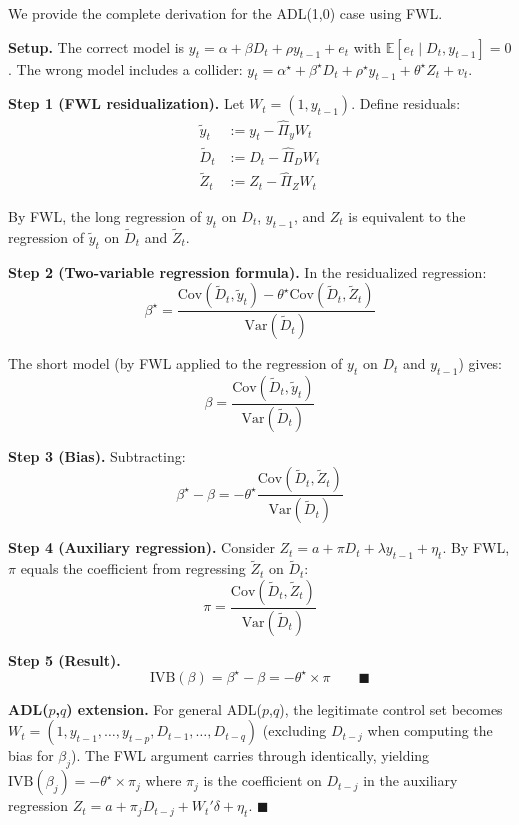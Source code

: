 \documentclass[
]{article}
\begin{document}
We provide the complete derivation for the ADL(1,0) case using FWL.

\textbf{Setup.} The correct model is
\(y_t = \alpha + \beta D_t + \rho y_{t-1} + e_t\) with
\(\mathbb{E}[e_t \mid D_t, y_{t-1}] = 0\). The wrong model includes a
collider:
\(y_t = \alpha^{\star} + \beta^{\star} D_t + \rho^{\star} y_{t-1} + \theta^{\star} Z_t + v_t\).

\textbf{Step 1 (FWL residualization).} Let \(W_t = (1, y_{t-1})\).
Define residuals: \begin{align*}
\tilde{y}_t &:= y_t - \hat{\Pi}_y W_t \\
\tilde{D}_t &:= D_t - \hat{\Pi}_D W_t \\
\tilde{Z}_t &:= Z_t - \hat{\Pi}_Z W_t
\end{align*}

By FWL, the long regression of \(y_t\) on \(D_t\), \(y_{t-1}\), and
\(Z_t\) is equivalent to the regression of \(\tilde{y}_t\) on
\(\tilde{D}_t\) and \(\tilde{Z}_t\).

\textbf{Step 2 (Two-variable regression formula).} In the residualized
regression: \[
\beta^{\star} = \frac{\text{Cov}(\tilde{D}_t, \tilde{y}_t) - \theta^{\star} \text{Cov}(\tilde{D}_t, \tilde{Z}_t)}{\text{Var}(\tilde{D}_t)}
\]

The short model (by FWL applied to the regression of \(y_t\) on \(D_t\)
and \(y_{t-1}\)) gives: \[
\beta = \frac{\text{Cov}(\tilde{D}_t, \tilde{y}_t)}{\text{Var}(\tilde{D}_t)}
\]

\textbf{Step 3 (Bias).} Subtracting: \[
\beta^{\star} - \beta = -\theta^{\star} \frac{\text{Cov}(\tilde{D}_t, \tilde{Z}_t)}{\text{Var}(\tilde{D}_t)}
\]

\textbf{Step 4 (Auxiliary regression).} Consider
\(Z_t = a + \pi D_t + \lambda y_{t-1} + \eta_t\). By FWL, \(\pi\) equals
the coefficient from regressing \(\tilde{Z}_t\) on \(\tilde{D}_t\): \[
\pi = \frac{\text{Cov}(\tilde{D}_t, \tilde{Z}_t)}{\text{Var}(\tilde{D}_t)}
\]

\textbf{Step 5 (Result).} \[
\text{IVB}(\beta) = \beta^{\star} - \beta = -\theta^{\star} \times \pi \qquad \blacksquare
\]

\textbf{ADL(\(p\),\(q\)) extension.} For general ADL(\(p\),\(q\)), the
legitimate control set becomes
\(W_t = (1, y_{t-1}, \ldots, y_{t-p}, D_{t-1}, \ldots, D_{t-q})\)
(excluding \(D_{t-j}\) when computing the bias for \(\beta_j\)). The FWL
argument carries through identically, yielding
\(\text{IVB}(\beta_j) = -\theta^{\star} \times \pi_j\) where \(\pi_j\)
is the coefficient on \(D_{t-j}\) in the auxiliary regression
\(Z_t = a + \pi_j D_{t-j} + W_t'\delta + \eta_t\). \(\blacksquare\)
\end{document}

